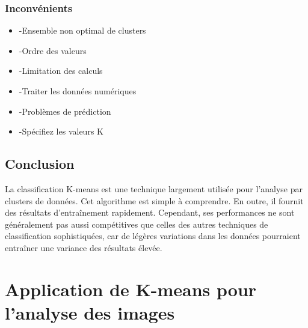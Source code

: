 \documentclass[a4paper,12pt]{report}
\begin{document}
\subsubsection{Inconvénients}

\begin{itemize}
    \item -Ensemble non optimal de clusters
    \item -Ordre des valeurs
    \item -Limitation des calculs
    \item -Traiter les données numériques
    \item -Problèmes de prédiction
    \item -Spécifiez les valeurs K
\end{itemize}

\subsection*{Conclusion} 
La classification K-means est une technique largement utilisée pour l’analyse par clusters de données. Cet algorithme est simple à comprendre. En outre, il fournit des résultats d’entraînement rapidement.
Cependant, ses performances ne sont généralement pas aussi compétitives que celles des autres techniques de classification sophistiquées, car de légères variations dans les données pourraient entraîner une variance des résultats élevée.\\

\section{Application de K-means pour l'analyse des images}
\end{document}
